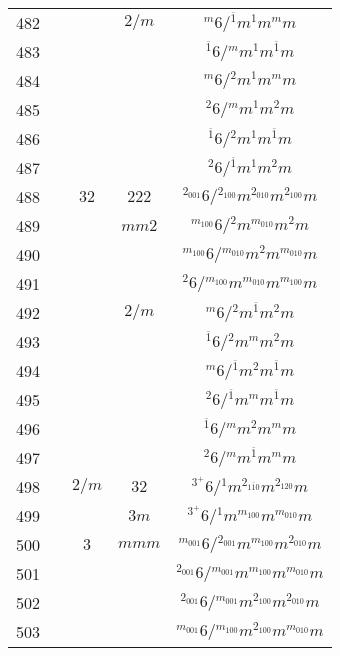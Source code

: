 \begin{longtable}{ccccc}
  482 &  &  & $2/m$ & ${}^{m} 6  / {}^{\overline{1}} m {}^{1} m {}^{m} m $\\
  483 &  &  &  & ${}^{\overline{1}} 6  / {}^{m} m {}^{1} m {}^{\overline{1}} m $\\
  484 &  &  &  & ${}^{m} 6  / {}^{2} m {}^{1} m {}^{m} m $\\
  485 &  &  &  & ${}^{2} 6  / {}^{m} m {}^{1} m {}^{2} m $\\
  486 &  &  &  & ${}^{\overline{1}} 6  / {}^{2} m {}^{1} m {}^{\overline{1}} m $\\
  487 &  &  &  & ${}^{2} 6  / {}^{\overline{1}} m {}^{1} m {}^{2} m $\\
  488 &  & $32$ & $222$ & ${}^{2_{001}} 6  / {}^{2_{100}} m {}^{2_{010}} m {}^{2_{100}} m $\\
  489 &  &  & $mm2$ & ${}^{m_{100}} 6  / {}^{2} m {}^{m_{010}} m {}^{2} m $\\
  490 &  &  &  & ${}^{m_{100}} 6  / {}^{m_{010}} m {}^{2} m {}^{m_{010}} m $\\
  491 &  &  &  & ${}^{2} 6  / {}^{m_{100}} m {}^{m_{010}} m {}^{m_{100}} m $\\
  492 &  &  & $2/m$ & ${}^{m} 6  / {}^{2} m {}^{\overline{1}} m {}^{2} m $\\
  493 &  &  &  & ${}^{\overline{1}} 6  / {}^{2} m {}^{m} m {}^{2} m $\\
  494 &  &  &  & ${}^{m} 6  / {}^{\overline{1}} m {}^{2} m {}^{\overline{1}} m $\\
  495 &  &  &  & ${}^{2} 6  / {}^{\overline{1}} m {}^{m} m {}^{\overline{1}} m $\\
  496 &  &  &  & ${}^{\overline{1}} 6  / {}^{m} m {}^{2} m {}^{m} m $\\
  497 &  &  &  & ${}^{2} 6  / {}^{m} m {}^{\overline{1}} m {}^{m} m $\\
  498 &  & $2/m$ & $32$ & ${}^{3^{+}} 6  / {}^{1} m {}^{2_{1\overline{1}0}} m {}^{2_{120}} m $\\
  499 &  &  & $3m$ & ${}^{3^{+}} 6  / {}^{1} m {}^{m_{100}} m {}^{m_{010}} m $\\
  500 &  & $3$ & $mmm$ & ${}^{m_{001}} 6  / {}^{2_{001}} m {}^{m_{100}} m {}^{2_{010}} m $\\
  501 &  &  &  & ${}^{2_{001}} 6  / {}^{m_{001}} m {}^{m_{100}} m {}^{m_{010}} m $\\
  502 &  &  &  & ${}^{2_{001}} 6  / {}^{m_{001}} m {}^{2_{100}} m {}^{2_{010}} m $\\
  503 &  &  &  & ${}^{m_{001}} 6  / {}^{m_{100}} m {}^{2_{100}} m {}^{m_{010}} m $\\

\end{longtable}
